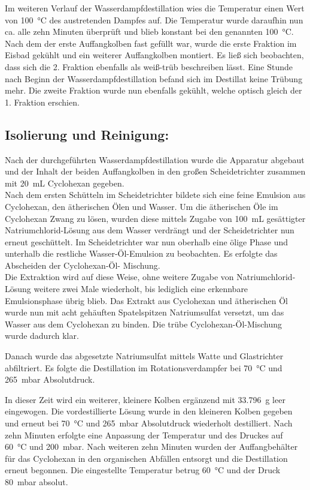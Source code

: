 Im weiteren Verlauf der Wasserdampfdestillation wies die Temperatur einen Wert von \SI{100}{\celsius} des austretenden Dampfes auf.
Die Temperatur wurde daraufhin nun ca. alle zehn Minuten überprüft und blieb konstant bei den genannten  \SI{100}{\celsius}.
Nach dem der erste Auffangkolben fast gefüllt war, wurde die erste Fraktion im Eisbad gekühlt und ein weiterer Auffangkolben montiert.
Es ließ sich beobachten, dass sich die 2. Fraktion ebenfalls als weiß-trüb beschreiben lässt. Eine Stunde nach Beginn der Wasserdampfdestillation befand sich im Destillat keine Trübung mehr. Die zweite Fraktion wurde nun ebenfalls gekühlt, welche optisch gleich der 1. Fraktion erschien.

\subsection*{Isolierung und Reinigung:}
Nach der durchgeführten Wasserdampfdestillation wurde die Apparatur abgebaut und der Inhalt der beiden Auffangkolben in den großen Scheidetrichter zusammen mit \SI{20}{\milli \liter} Cyclohexan gegeben.\\
Nach dem ersten Schütteln im Scheidetrichter bildete sich eine feine Emulsion aus Cyclohexan, den ätherischen Ölen und Wasser.
Um die ätherischen Öle im Cyclohexan Zwang zu lösen, wurden diese mittels Zugabe von \SI{100}{\milli \liter} gesättigter Natriumchlorid-Lösung aus dem Wasser verdrängt und der Scheidetrichter nun erneut geschüttelt.
Im Scheidetrichter war nun oberhalb eine ölige Phase und unterhalb die restliche Wasser-Öl-Emulsion zu beobachten. Es erfolgte das Abscheiden der Cyclohexan-Öl- Mischung.\\

Die Extraktion wird auf diese Weise, ohne weitere Zugabe von Natriumchlorid-Lösung weitere zwei Male wiederholt, bis lediglich eine erkennbare Emulsionsphase übrig blieb.
Das Extrakt aus Cyclohexan und ätherischen Öl wurde nun mit acht gehäuften Spatelspitzen Natriumsulfat versetzt, um das Wasser aus dem Cyclohexan zu binden. Die trübe Cyclohexan-Öl-Mischung wurde dadurch klar. 

Danach wurde das abgesetzte Natriumsulfat mittels Watte und Glastrichter abfiltriert. Es folgte die Destillation im Rotationsverdampfer bei \SI{70}{\celsius} und \SI{265}{\milli \bar} Absolutdruck.

In dieser Zeit wird ein weiterer, kleinere Kolben ergänzend mit \SI{33,796}{\gram} leer eingewogen.
Die vordestillierte Lösung wurde in den kleineren Kolben gegeben und erneut bei \SI{70}{\celsius} und \SI{265}{\milli \bar} Absolutdruck wiederholt destilliert.
Nach zehn Minuten erfolgte eine Anpassung der Temperatur und  des Druckes auf \SI{60}{\celsius} und \SI{200}{\milli \bar}.
Nach weiteren zehn Minuten wurden der Auffangbehälter für das Cyclohexan in den organischen Abfällen entsorgt und die Destillation erneut begonnen. Die eingestellte Temperatur betrug \SI{60}{\celsius} und der Druck \SI{80}{\milli \bar} absolut.\\

